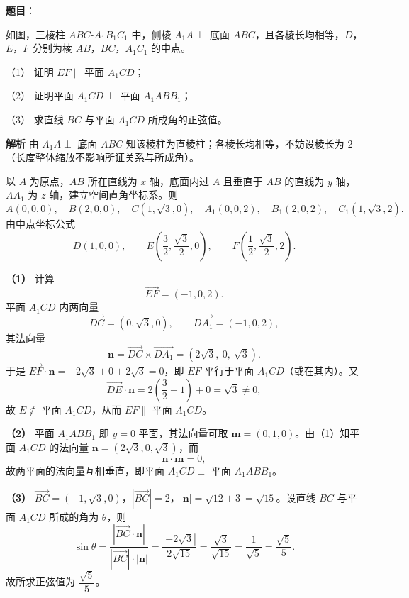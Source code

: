 \begin{answer}

\textbf{题目}：

如图，三棱柱 $ABC\text{-}A_1B_1C_1$ 中，侧棱 $A_1A\perp$ 底面 $ABC$，且各棱长均相等，$D$，$E$，$F$ 分别为棱 $AB$，$BC$，$A_1C_1$ 的中点。

（1） 证明 $EF\parallel$ 平面 $A_1CD$；

（2） 证明平面 $A_1CD\perp$ 平面 $A_1ABB_1$；

（3） 求直线 $BC$ 与平面 $A_1CD$ 所成角的正弦值。
\nopagebreak[4]
\begin{center}\end{center}
\nopagebreak[4]
\textbf{解析}
由 $A_1A\perp$ 底面 $ABC$ 知该棱柱为直棱柱；各棱长均相等，不妨设棱长为 $2$（长度整体缩放不影响所证关系与所成角）。

以 $A$ 为原点，$AB$ 所在直线为 $x$ 轴，底面内过 $A$ 且垂直于 $AB$ 的直线为 $y$ 轴，$AA_1$ 为 $z$ 轴，建立空间直角坐标系。则
\nopagebreak[4]
\[A(0,0,0),\quad B(2,0,0),\quad C(1,\sqrt3,0),\quad A_1(0,0,2),\quad B_1(2,0,2),\quad C_1(1,\sqrt3,2).\]
由中点坐标公式
\nopagebreak[4]
\[D(1,0,0),\qquad E\left(\frac32,\frac{\sqrt3}2,0\right),\qquad F\left(\frac12,\frac{\sqrt3}2,2\right).\]

\textbf{（1）} 计算
\nopagebreak[4]
\[\overrightarrow{EF}=\left(-1,0,2\right).\]
平面 $A_1CD$ 内两向量
\nopagebreak[4]
\[\overrightarrow{DC}=(0,\sqrt3,0),\qquad\overrightarrow{DA_1}=(-1,0,2),\]
其法向量
\nopagebreak[4]
\[\mathbf n=\overrightarrow{DC}\times\overrightarrow{DA_1}=(2\sqrt3,\ 0,\ \sqrt3).\]
于是 $\overrightarrow{EF}\cdot\mathbf n=-2\sqrt3+0+2\sqrt3=0$，即 $EF$ 平行于平面 $A_1CD$（或在其内）。又
\nopagebreak[4]
\[\overrightarrow{DE}\cdot\mathbf n=2\left(\frac32-1\right)+0=\sqrt3\neq0,\]
故 $E\notin$ 平面 $A_1CD$，从而 $EF\parallel$ 平面 $A_1CD$。

\textbf{（2）} 平面 $A_1ABB_1$ 即 $y=0$ 平面，其法向量可取 $\mathbf m=(0,1,0)$。由（1）知平面 $A_1CD$ 的法向量 $\mathbf n=(2\sqrt3,0,\sqrt3)$，而
\nopagebreak[4]
\[\mathbf n\cdot\mathbf m=0,\]
故两平面的法向量互相垂直，即平面 $A_1CD\perp$ 平面 $A_1ABB_1$。

\textbf{（3）} $\overrightarrow{BC}=(-1,\sqrt3,0)$，$|\overrightarrow{BC}|=2$，$|\mathbf n|=\sqrt{12+3}=\sqrt{15}$。设直线 $BC$ 与平面 $A_1CD$ 所成的角为 $\theta$，则
\nopagebreak[4]
\[\sin\theta=\frac{|\overrightarrow{BC}\cdot\mathbf n|}{|\overrightarrow{BC}|\cdot|\mathbf n|}
=\frac{|{-2\sqrt3}|}{2\sqrt{15}}=\frac{\sqrt3}{\sqrt{15}}=\frac1{\sqrt5}=\frac{\sqrt5}5.\]
故所求正弦值为 $\dfrac{\sqrt5}5$。




\end{answer}

